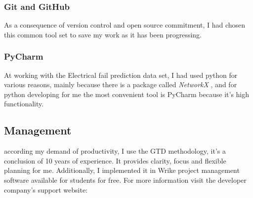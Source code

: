 			\subsubsection{Git and GitHub}
As a consequence of version control and open source commitment, I had chosen this common tool set to save my work as it has been progressing.
\cite{Github}
			\subsubsection{PyCharm}
At working with the Electrical fail prediction data set, I had used python for various reasons, mainly because there is a package called \textit{NetworkX} \cite{NetworkX}, and for python developing for me the most convenient tool is PyCharm because it's high functionality.
\cite{PyCharm}	
		\subsection{Management}
according my demand of productivity, I use the GTD\cite{GTD} methodology, it's a conclusion of 10 years of experience. It provides clarity, focus and flexible planning for me. Additionally, I implemented it in Wrike \cite{WRIKE} project management software available for students for free. For more information visit the developer company's support website: \cite{WRIKE_for_students}
